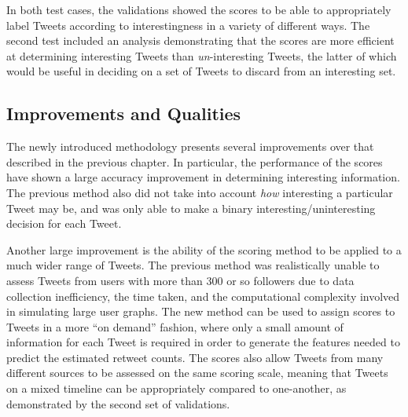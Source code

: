 In both test cases, the validations showed the scores to be able to appropriately label Tweets according to interestingness in a variety of different ways. The second test included an analysis demonstrating that the scores are more efficient at determining interesting Tweets than \textit{un}-interesting Tweets, the latter of which would be useful in deciding on a set of Tweets to discard from an interesting set. 

\subsection{Improvements and Qualities}
The newly introduced methodology presents several improvements over that described in the previous chapter. In particular, the performance of the scores have shown a large accuracy improvement in determining interesting information. The previous method also did not take into account \textit{how} interesting a particular Tweet may be, and was only able to make a binary interesting/uninteresting decision for each Tweet.

Another large improvement is the ability of the scoring method to be applied to a much wider range of Tweets. The previous method was realistically unable to assess Tweets from users with more than 300 or so followers due to data collection inefficiency, the time taken, and the computational complexity involved in simulating large user graphs. The new method can be used to assign scores to Tweets in a more ``on demand'' fashion, where only a small amount of information for each Tweet is required in order to generate the features needed to predict the estimated retweet counts. The scores also allow Tweets from many different sources to be assessed on the same scoring scale, meaning that Tweets on a mixed timeline can be appropriately compared to one-another, as demonstrated by the second set of validations.
